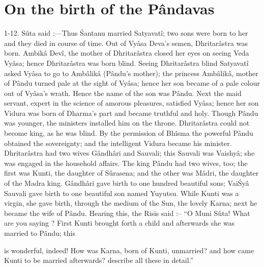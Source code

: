 ﻿\chapter{On the birth of the P\^andavas}

1-12. S\^uta said :—Thus \'Santanu married Satyavat\^i; two sons were born to her and they died in course of time. Out of Vy\^asa Deva's semen, Dhritar\^astra was born. Ambik\^a Dev\^i, the mother of Dhritar\^astra closed her eyes on seeing Veda Vy\^asa; hence Dhritar\^astra was born blind. Seeing Dhritar\^astra blind Satyavat\^i asked Vy\^asa to go to Amb\^alik\^a (P\^andu's mother); the princess Amb\^alik\^a, mother of P\^andu turned pale at the sight of Vy\^asa; hence her son became of a pale colour out of Vy\^asa's wrath. Hence the name of the son was P\^andu. Next the maid servant, expert in the science of amorous pleasures, satisfied Vy\^asa; hence her son Vidura was born of Dharma's part and became truthful and holy. Though P\^andu was younger, the ministers installed him on the throne. Dhritar\^astra could not become king, as he was blind. By the permission of Bh\^isma the powerful P\^andu obtained the sovereignty; and the intelligent Vidura became his minister. Dhritar\^astra had two wives G\^andh\^ari and Sauvali; this Sauvali was Vaishy\^a; she was engaged in the household affairs. The king P\^andu had two wives, too; the first was Kunti, the daughter of S\^urasena; and the other was M\^adri, the daughter of the Madra king. G\^andh\^ari gave birth to one hundred beautiful sons; Vai\'Sy\^a Sauvali gave birth to one beautiful son named Yuyutsu. While Kunti was a virgin, she gave birth, through the medium of the Sun, the lovely Karna; next he became the wife of P\^andu. Hearing this, the Risis said :-- ``O Muni S\^uta! What are you saying ? First Kunti brought forth a child and afterwards she was married to P\^andu; this

is wonderful, indeed! How was Karna, born of Kunti, unmarried? and how came Kunti to be married afterwards? describe all these in detail.''

